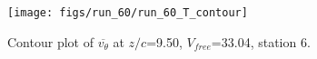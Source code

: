 \begin{figure}[H]
\centering
\texttt{[image: figs/run\_60/run\_60\_T\_contour]}
\caption{Contour plot of $\overline{v_{\theta}}$ at $z/c$=9.50, $V_{free}$=33.04, station 6.}
\label{fig:run_60_T_contour}
\end{figure}


